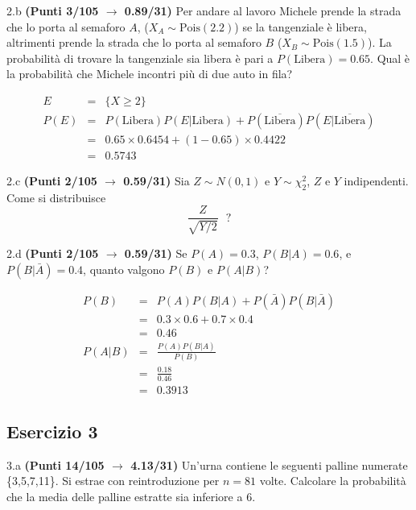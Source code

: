 \documentclass[
  11pt,
]{book}
\theoremstyle{mytheoremstyle}
\theoremstyle{mydefstyle}
\newenvironment{sol}
  {
  \begin{tcolorbox}[enhanced,breakable,arc=0.1mm,boxrule=1pt,colback=white,colframe=iblue,
  title=\bf \fontfamily{lmss}\selectfont \hspace{.5 cm} Soluzione,drop fuzzy shadow]

}{
\end{tcolorbox}
  }
\begin{document}
2.b \textbf{(Punti 3/105 \(\rightarrow\) 0.89/31)} Per andare al lavoro Michele prende la strada che
lo porta al semaforo \(A\), (\(X_A\sim \text{Pois}(2.2)\)) se la tangenziale è libera, altrimenti
prende la strada che lo porta al semaforo \(B\) (\(X_B\sim \text{Pois}(1.5)\)).
La probabilità di trovare la tangenziale sia libera è pari a
\(P(\text{Libera})=0.65\). Qual è la probabilità che Michele incontri più di due auto in fila?

\begin{sol}
\begin{eqnarray*}
E &=& \{X\ge 2\}\\
P(E) &=& P(\text{Libera})P(E|\text{Libera})+P\left(\overline{\text{Libera}}\right)P\left(E|\overline{\text{Libera}}\right)\\
   &=&  0.65\times0.6454+(1-0.65)\times 0.4422\\
  &=& 0.5743
\end{eqnarray*}

\end{sol}

2.c \textbf{(Punti 2/105 \(\rightarrow\) 0.59/31)} Sia \(Z\sim N(0,1)\) e \(Y\sim \chi^2_2\), \(Z\) e \(Y\) indipendenti.
Come si distribuisce
\[
\frac{Z}{\sqrt{Y/2}} ~~~?
\]

2.d \textbf{(Punti 2/105 \(\rightarrow\) 0.59/31)} Se \(P(A)=0.3\), \(P(B|A)=0.6\), e \(P(B|\bar A)=0.4\), quanto valgono \(P(B)\) e \(P(A|B)\)?

\begin{sol}
\begin{eqnarray*}
P(B) &=& P(A)P(B|A)+P(\bar A)P(B|\bar A)\\
     &=& 0.3\times0.6+0.7\times 0.4\\
     &=& 0.46\\
P(A|B) &=& \frac {P(A)P(B|A)}{P(B)}\\
       &=& \frac {0.18}{0.46}\\
       &=& 0.3913
\end{eqnarray*}

\end{sol}

\subsection{Esercizio 3}\label{esercizio-3-31}

3.a \textbf{(Punti 14/105 \(\rightarrow\) 4.13/31)} Un'urna contiene le seguenti palline numerate \{3,5,7,11\}. Si estrae con reintroduzione per \(n=81\) volte.
Calcolare la probabilità che la media delle palline estratte sia inferiore a 6.
\end{document}
